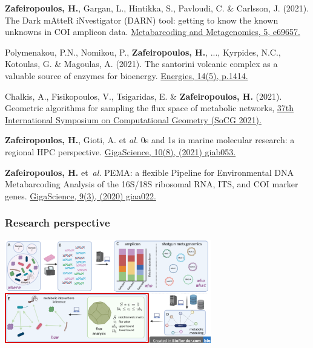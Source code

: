 \documentclass{beamer}
\begin{document}
\begin{darkframes}
\begin{frame}[label=bibliography]{}
\begin{thebibliography}{9}
         \tiny
            \textbf{Zafeiropoulos, H.}, Gargan, L., Hintikka, S., Pavloudi, C. \& Carlsson, J. (2021). The Dark mAtteR iNvestigator (DARN) tool: getting to know the known unknowns in COI amplicon data. \href{https://mbmg.pensoft.net/article/69657/list/9/}{Metabarcoding and Metagenomics, 5, e69657.}

         \tiny
            Polymenakou, P.N., Nomikou, P., \textbf{Zafeiropoulos, H.}, ..., Kyrpides, N.C., Kotoulas, G. \& Magoulas, A. (2021). 
            The santorini volcanic complex as a valuable source of enzymes for bioenergy. 
            \href{https://doi.org/10.3390/en14051414}{Energies, 14(5), p.1414.}
   
         \tiny
            Chalkis, A., Fisikopoulos, V., Tsigaridas, E. \& \textbf{Zafeiropoulos, H.} (2021). Geometric algorithms for sampling the flux space of metabolic networks, \href{ https://drops.dagstuhl.de/opus/volltexte/2021/13820/}{37th International Symposium on Computational Geometry (SoCG 2021).}

         \tiny
            \textbf{Zafeiropoulos, H.}, Gioti, A. et \textit{al.} 
            0s and 1s in marine molecular research: a regional HPC perspective. 
            \href{https://academic.oup.com/gigascience/article/10/8/giab053/6353916}{GigaScience, 10(8), (2021) giab053.}

         \tiny
            \textbf{Zafeiropoulos, H.} et~\textit{al.}
            PEMA: a flexible Pipeline for Environmental DNA Metabarcoding Analysis of the 16S/18S ribosomal RNA, ITS, and COI marker genes. 
            \href{https://academic.oup.com/gigascience/article/9/3/giaa022/5803335}{GigaScience, 9(3), (2020) giaa022.}

      \end{thebibliography}

   \end{frame}


   \begin{frame}
      \frametitle{\textbf{Research perspective}}

      \includegraphics[width=90mm]{resources/reverse_ecology_transp_future.png}


\end{frame}
\end{darkframes}
\end{document}
